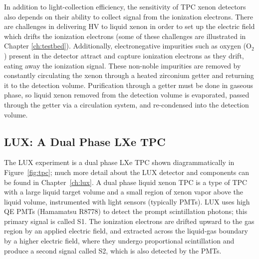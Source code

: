 In addition to light-collection efficiency, the sensitivity of \ac{TPC} xenon detectors also depends on their ability to collect signal from the ionization electrons. There are challenges in delivering \ac{HV} to liquid xenon in order to set up the electric field which drifts the ionization electrons (some of these challenges are illustrated in Chapter \ref{ch:testbed}). Additionally, electronegative impurities such as oxygen (O$_{2}$) present in the detector attract and capture ionization electrons as they drift, eating away the ionization signal. These non-noble impurities are removed by constantly circulating the xenon through a heated zirconium getter and returning it to the detection volume. Purification through a getter must be done in gaseous phase, so liquid xenon removed from the detection volume is evaporated, passed through the getter via a circulation system, and re-condensed into the detection volume. 

\FloatBarrier
\subsection{LUX: A Dual Phase LXe TPC}
The \ac{LUX} experiment is a dual phase \ac{LXe} \ac{TPC} shown diagrammatically in Figure~\ref{fig:tpc}; much more detail about the \ac{LUX} detector and components can be found in Chapter~\ref{ch:lux}. A dual phase liquid xenon \ac{TPC} is a type of \ac{TPC} with a large liquid target volume and a small region of xenon vapor above the liquid volume, instrumented with light sensors (typically \ac{PMT}s). \ac{LUX} uses high \ac{QE} \ac{PMT}s (Hamamatsu R8778) to detect the prompt scintillation photons; this primary signal is called S1. The ionization electrons are drifted upward to the gas region by an applied electric field, and extracted across the liquid-gas boundary by a higher electric field, where they undergo proportional scintillation and produce a second signal called S2, which is also detected by the \ac{PMT}s. 

